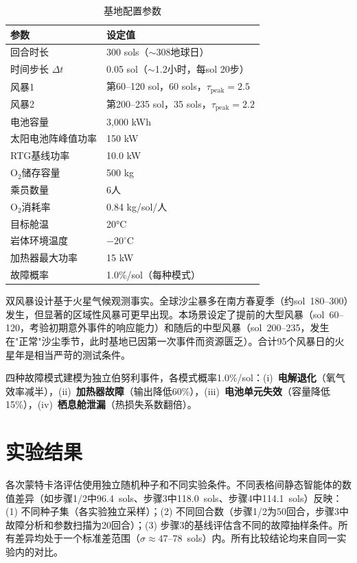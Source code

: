 \documentclass[11pt,a4paper]{ctexart}
\begin{document}
\begin{table}[H]
  \centering
  \caption{基地配置参数}
  \label{tab:scenario}
  \begin{tabular}{@{}ll@{}}
    \toprule
    \textbf{参数} & \textbf{设定值} \\
    \midrule
    回合时长 & 300 sols（$\sim$308地球日） \\
    时间步长 $\Delta t$ & 0.05 sol（$\sim$1.2小时，每sol 20步） \\
    风暴1 & 第60--120 sol，60 sols，$\tau_{\text{peak}} = 2.5$ \\
    风暴2 & 第200--235 sol，35 sols，$\tau_{\text{peak}} = 2.2$ \\
    电池容量 & 3,000 kWh \\
    太阳电池阵峰值功率 & 150 kW \\
    RTG基线功率 & 10.0 kW \\
    O$_2$储存容量 & 500 kg \\
    乘员数量 & 6人 \\
    O$_2$消耗率 & 0.84 kg/sol/人 \\
    目标舱温 & 20°C \\
    岩体环境温度 & $-20^\circ$C \\
    加热器最大功率 & 15 kW \\
    故障概率 & 1.0\%/sol（每种模式） \\
    \bottomrule
  \end{tabular}
\end{table}

双风暴设计基于火星气候观测事实。全球沙尘暴多在南方春夏季（约sol~180--300）发生，但显著的区域性风暴可更早出现。本场景设定了提前的大型风暴（sol~60--120，考验初期意外事件的响应能力）和随后的中型风暴（sol~200--235，发生在"正常"沙尘季节，此时基地已因第一次事件而资源匮乏）。合计95个风暴日的火星年是相当严苛的测试条件。

四种故障模式建模为独立伯努利事件，各模式概率1.0\%/sol：(i)~\textbf{电解退化}（氧气效率减半），(ii)~\textbf{加热器故障}（输出降低60\%），(iii)~\textbf{电池单元失效}（容量降低15\%），(iv)~\textbf{栖息舱泄漏}（热损失系数翻倍）。

\section{实验结果}

各次蒙特卡洛评估使用独立随机种子和不同实验条件。不同表格间静态智能体的数值差异（如步骤1/2中96.4~sols、步骤3中118.0~sols、步骤4中114.1~sols）反映：(1) 不同种子集（各实验独立采样）；(2) 不同回合数（步骤1/2为50回合，步骤3中故障分析和参数扫描为20回合）；(3) 步骤3的基线评估含不同的故障抽样条件。所有差异均处于一个标准差范围（$\sigma \approx 47$--$78$~sols）内。所有比较结论均来自同一实验内的对比。
\end{document}
